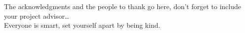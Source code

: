\documentclass[
11pt, %
english, %
doublespacing, %
headsepline, %
]{MastersDoctoralThesis} %
\begin{document}

\begin{acknowledgements}
\addchaptertocentry{\acknowledgementname} %
The acknowledgments and the people to thank go here, don't forget to include your project advisor\ldots\\ 
Everyone is smart, set yourself apart by being kind.
\end{acknowledgements}


\tableofcontents %

\listoffigures %

\listoftables %

\end{document}
